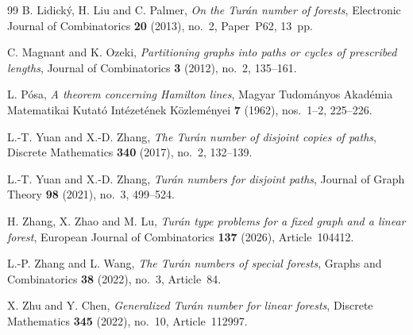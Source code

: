 \documentclass[10pt]{article}
\theoremstyle{compactplain}
\theoremstyle{remark}\newtheorem{remark}[theorem]{Remark}
\begin{document}
\begin{thebibliography}{99}
B. Lidick\'y, H. Liu and C. Palmer,
\emph{On the Tur\'an number of forests},
Electronic Journal of Combinatorics \textbf{20} (2013), no.~2,
Paper~P62, 13~pp.

C. Magnant and K. Ozeki,
\emph{Partitioning graphs into paths or cycles of prescribed lengths},
Journal of Combinatorics \textbf{3} (2012), no.~2, 135--161.

L. P\'osa,
\emph{A theorem concerning Hamilton lines},
Magyar Tudom\'anyos Akad\'emia Matematikai Kutat\'o Int\'ezet\'enek
K\"ozlem\'enyei \textbf{7} (1962), nos.~1--2, 225--226.

L.-T. Yuan and X.-D. Zhang,
\emph{The Tur\'an number of disjoint copies of paths},
Discrete Mathematics \textbf{340} (2017), no.~2, 132--139.

L.-T. Yuan and X.-D. Zhang,
\emph{Tur\'an numbers for disjoint paths},
Journal of Graph Theory \textbf{98} (2021), no.~3, 499--524.

H. Zhang, X. Zhao and M. Lu,
\emph{Tur\'an type problems for a fixed graph and a linear forest},
European Journal of Combinatorics \textbf{137} (2026), Article~104412.

L.-P. Zhang and L. Wang,
\emph{The Tur\'an numbers of special forests},
Graphs and Combinatorics \textbf{38} (2022), no.~3, Article~84.

X. Zhu and Y. Chen,
\emph{Generalized Tur\'an number for linear forests},
Discrete Mathematics \textbf{345} (2022), no.~10, Article~112997.

\end{thebibliography}
\end{document}
